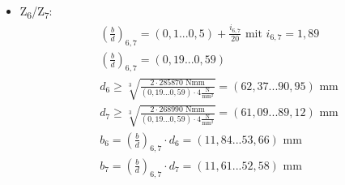 \begin{itemize}
\item {Z\textsubscript{6}/Z\textsubscript{7}:}
\begin{align*}
	& \left(\frac{b}{d} \right) _{6,7} = (0,1...0,5) + \frac{i_{6,7}}{20} \text{ mit } i_{6,7} =  1,89 \\
	&\left(\frac{b}{d} \right) _{6,7}=  (0,19...0,59) \\
	&d_6 \ge \sqrt[3]{\frac{2 \cdot 285870 \text{ Nmm}}{(0,19...0,59) \cdot  4 \frac{\text{N}}{\text{mm}^2}}}= (62,37...90,95) \text{ mm}\\
	&d_7 \ge \sqrt[3]{\frac{2 \cdot 268990 \text{ Nmm}}{(0,19...0,59) \cdot  4 \frac{\text{N}}{\text{mm}^2}}}= (61,09...89,12) \text{ mm}  \\
	&b_6= \left(\frac{b}{d} \right) _{6,7}  \cdot d_6 = (11,84...53,66) \text{ mm}  \\
	&b_7= \left(\frac{b}{d} \right) _{6,7}  \cdot d_7 = (11,61...52,58) \text{ mm}  
\end{align*}
\end{itemize}
